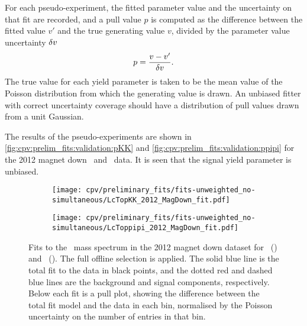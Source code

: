 For each pseudo-experiment, the fitted parameter value and the uncertainty on 
that fit are recorded, and a pull value $p$ is computed as the difference 
between the fitted value $v'$ and the true generating value $v$, divided by the 
parameter value uncertainty $\delta{v}$
\begin{equation}
  p = \frac{v - v'}{\delta{v}}.
\end{equation}
The true value for each yield parameter is taken to be the mean value of the 
Poisson distribution from which the generating value is drawn.
An unbiased fitter with correct uncertainty coverage should have a distribution 
of pull values drawn from a unit Gaussian.

The results of the pseudo-experiments are shown in 
\cref{fig:cpv:prelim_fits:validation:pKK} and 
\cref{fig:cpv:prelim_fits:validation:ppipi} for the 2012 magnet down \pKK\ and 
\ppipi\ data.
It is seen that the signal yield parameter is unbiased.

\begin{figure}
  \begin{subfigure}[b]{0.5\textwidth}
    \texttt{[image: cpv/preliminary\_fits/fits-unweighted\_no-simultaneous/LcTopKK\_2012\_MagDown\_fit.pdf]}
    \caption{\pKK}
    \label{fig:cpv:prelim_fits:full:pKK}
  \end{subfigure}
  \begin{subfigure}[b]{0.5\textwidth}
    \texttt{[image: cpv/preliminary\_fits/fits-unweighted\_no-simultaneous/LcToppipi\_2012\_MagDown\_fit.pdf]}
    \caption{\ppipi}
    \label{fig:cpv:prelim_fits:full:ppipi}
  \end{subfigure}
  \caption{%
    Fits to the \PLambdac\ mass spectrum in the 2012 magnet down dataset for 
    \pKK~() and 
    \ppipi~().
    The full offline selection is applied.
    The solid blue line is the total fit to the data in black points, and the 
    dotted red and dashed blue lines are the background and signal components, 
    respectively.
    Below each fit is a pull plot, showing the difference between the total fit 
    model and the data in each bin, normalised by the Poisson uncertainty on 
    the number of entries in that bin.
  }
  \label{fig:cpv:prelim_fits:full}
\end{figure}

